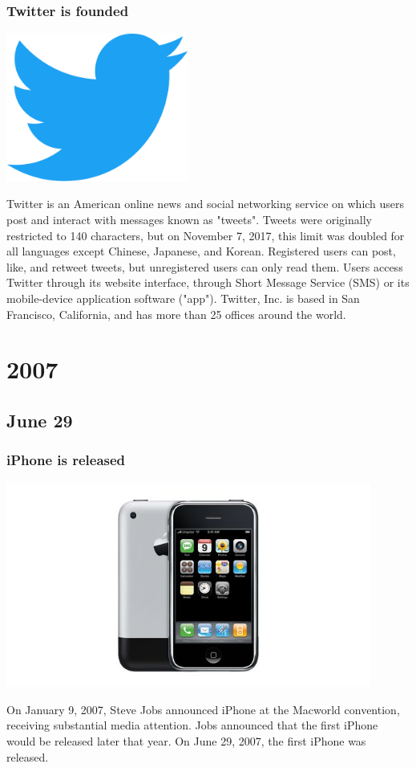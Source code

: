 \documentclass[11pt]{report}
\begin{document}
\subsection{Twitter is founded}
\vspace{2mm}\begin{center}\includegraphics[width=6cm]{./img/twitter.png}\end{center}
Twitter is an American online news and social networking service on which users post and interact with messages known as "tweets". Tweets were originally restricted to 140 characters, but on November 7, 2017, this limit was doubled for all languages except Chinese, Japanese, and Korean. Registered users can post, like, and retweet tweets, but unregistered users can only read them. Users access Twitter through its website interface, through Short Message Service (SMS) or its mobile-device application software ("app"). Twitter, Inc. is based in San Francisco, California, and has more than 25 offices around the world.

\chapter{2007}
\section{June 29}
\subsection{iPhone is released}
\vspace{2mm}\begin{center}\includegraphics[width=12cm]{./img/iphone1.jpg}\end{center}
On January 9, 2007, Steve Jobs announced iPhone at the Macworld convention, receiving substantial media attention. Jobs announced that the first iPhone would be released later that year. On June 29, 2007, the first iPhone was released.
\end{document}
